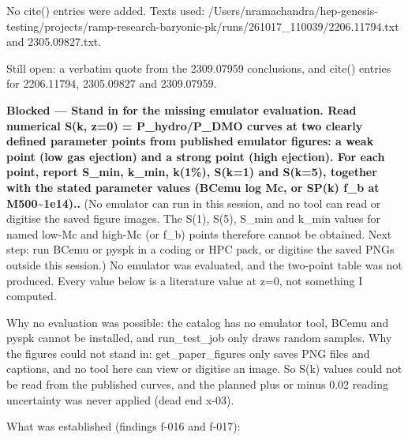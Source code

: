 \documentclass[11pt,a4paper]{article}
\begin{document}
No cite() entries were added. Texts used: /Users/nramachandra/hep-genesis-testing/projects/ramp-research-baryonic-pk/runs/261017\_110039/2206.11794.txt and 2305.09827.txt.

Still open: a verbatim quote from the 2309.07959 conclusions, and cite() entries for 2206.11794, 2305.09827 and 2309.07959.

\textbf{Blocked --- Stand in for the missing emulator evaluation. Read numerical S(k, z=0) = P\_hydro/P\_DMO curves at two clearly defined parameter points from published emulator figures: a weak point (low gas ejection) and a strong point (high ejection). For each point, report S\_min, k\_min, k(1\%), S(k=1) and S(k=5), together with the stated parameter values (BCemu log Mc, or SP(k) f\_b at M500\textasciitilde{}1e14)..} (No emulator can run in this session, and no tool can read or digitise the saved figure images. The S(1), S(5), S\_min and k\_min values for named low-Mc and high-Mc (or f\_b) points therefore cannot be obtained. Next step: run BCemu or pyspk in a coding or HPC pack, or digitise the saved PNGs outside this session.) No emulator was evaluated, and the two-point table was not produced. Every value below is a literature value at z=0, not something I computed.

Why no evaluation was possible: the catalog has no emulator tool, BCemu and pyspk cannot be installed, and run\_test\_job only draws random samples. Why the figures could not stand in: get\_paper\_figures only saves PNG files and captions, and no tool here can view or digitise an image. So S(k) values could not be read from the published curves, and the planned plus or minus 0.02 reading uncertainty was never applied (dead end x-03).

What was established (findings f-016 and f-017):
\end{document}

